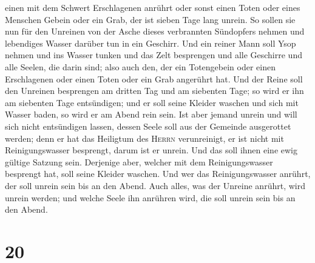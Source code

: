 einen mit dem Schwert Erschlagenen anrührt oder sonst einen Toten oder
eines Menschen Gebein oder ein Grab, der ist sieben Tage lang unrein.
 So sollen sie nun für den Unreinen von der Asche dieses
verbrannten Sündopfers nehmen und lebendiges Wasser darüber tun in ein
Geschirr.  Und ein reiner Mann soll Ysop nehmen und ins
Wasser tunken und das Zelt besprengen und alle Geschirre und alle
Seelen, die darin sind; also auch den, der ein Totengebein oder einen
Erschlagenen oder einen Toten oder ein Grab angerührt hat.
 Und der Reine soll den Unreinen besprengen am dritten
Tag und am siebenten Tage; so wird er ihn am siebenten Tage entsündigen;
und er soll seine Kleider waschen und sich mit Wasser baden, so wird er
am Abend rein sein.  Ist aber jemand unrein und will sich
nicht entsündigen lassen, dessen Seele soll aus der Gemeinde ausgerottet
werden; denn er hat das Heiligtum des \textsc{Herrn} verunreinigt, er
ist nicht mit Reinigungswasser besprengt, darum ist er unrein.
 Und das soll ihnen eine ewig gültige Satzung sein.
Derjenige aber, welcher mit dem Reinigungswasser besprengt hat, soll
seine Kleider waschen. Und wer das Reinigungswasser anrührt, der soll
unrein sein bis an den Abend.  Auch alles, was der
Unreine anrührt, wird unrein werden; und welche Seele ihn anrühren wird,
die soll unrein sein bis an den Abend.

\hypertarget{section-19}{%
\section{20}\label{section-19}}


